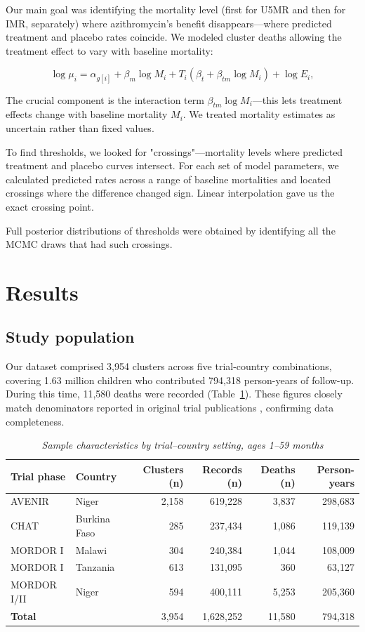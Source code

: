 \documentclass[11pt]{article}\usepackage[]{graphicx}\usepackage[]{xcolor}
\begin{document}
Our main goal was identifying the mortality level (first for U5MR and then for IMR, separately) where azithromycin's benefit disappears---where predicted treatment and placebo rates coincide. We modeled cluster deaths allowing the treatment effect to vary with baseline mortality:

\[
\log \mu_i = \alpha_{g[i]} + \beta_m \log M_i + T_i(\beta_t + \beta_{tm}\log M_i) + \log E_i,
\]

The crucial component is the interaction term $\beta_{tm}\log M_i$---this lets treatment effects change with baseline mortality $M_i$. We treated mortality estimates as uncertain rather than fixed values.

To find thresholds, we looked for "crossings"---mortality levels where predicted treatment and placebo curves intersect. For each set of model parameters, we calculated predicted rates across a range of baseline mortalities and located crossings where the difference changed sign. Linear interpolation gave us the exact crossing point.

Full posterior distributions of thresholds were obtained by identifying all the MCMC draws that had such crossings.

\section{Results}

\subsection{Study population}

Our dataset comprised 3,954 clusters across five trial-country combinations, covering 1.63 million children who contributed 794,318 person-years of follow-up. During this time, 11,580 deaths were recorded (Table~\ref{tab:analysis-sample}). These figures closely match denominators reported in original trial publications \citep{keenan2018nejm, oldenburg2024jama, o2024azithromycin}, confirming data completeness.

\linespread{1.2}
\begin{table}[!h]
\centering
\caption{\emph{Sample characteristics by trial--country setting, ages 1--59 months}}
\label{tab:analysis-sample}
\begin{tabular}{l l r r r r}
\toprule
Trial phase & Country & Clusters (n) & Records (n) & Deaths (n) & Person-years \\
\midrule
AVENIR      & Niger        & 2,158 & 619,228 & 3,837 & 298,683 \\
CHAT        & Burkina Faso &   285 & 237,434 & 1,086 & 119,139 \\
MORDOR I    & Malawi       &   304 & 240,384 & 1,044 & 108,009 \\
MORDOR I    & Tanzania     &   613 & 131,095 &   360 &  63,127 \\
MORDOR I/II & Niger        &   594 & 400,111 & 5,253 & 205,360 \\
\midrule
\textbf{Total} &            & 3,954 & 1,628,252 & 11,580 & 794,318 \\
\bottomrule
\end{tabular}
\end{table}
\linespread{1.5}
\end{document}
